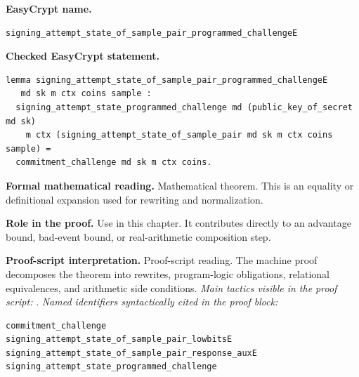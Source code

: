 \begin{formaltheorem}
\noindent\textbf{EasyCrypt name.}
\begin{lstlisting}[language=EasyCrypt,basicstyle=\ttfamily\scriptsize]
signing_attempt_state_of_sample_pair_programmed_challengeE
\end{lstlisting}
\noindent\textbf{Checked EasyCrypt statement.}
\begin{lstlisting}[language=EasyCrypt,basicstyle=\ttfamily\scriptsize]
lemma signing_attempt_state_of_sample_pair_programmed_challengeE
   md sk m ctx coins sample :
  signing_attempt_state_programmed_challenge md (public_key_of_secret md sk)
    m ctx (signing_attempt_state_of_sample_pair md sk m ctx coins sample) =
  commitment_challenge md sk m ctx coins.
\end{lstlisting}
\noindent\textbf{Formal mathematical reading.}
Mathematical theorem. This is an equality or definitional expansion used for rewriting and normalization.

\noindent\textbf{Role in the proof.}
Use in this chapter. It contributes directly to an advantage bound, bad-event bound, or real-arithmetic composition step.

\noindent\textbf{Proof-script interpretation.}
Proof-script reading. The machine proof decomposes the theorem into rewrites, program-logic obligations, relational equivalences, and arithmetic side conditions.
\emph{Main tactics visible in the proof script:} .
\emph{Named identifiers syntactically cited in the proof block:}
\begin{lstlisting}[language=EasyCrypt,basicstyle=\ttfamily\scriptsize]
commitment_challenge
signing_attempt_state_of_sample_pair_lowbitsE
signing_attempt_state_of_sample_pair_response_auxE
signing_attempt_state_programmed_challenge
\end{lstlisting}

\end{formaltheorem}

